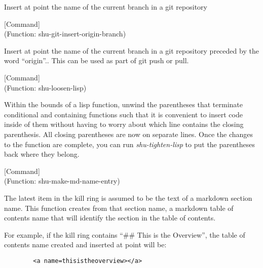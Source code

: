 \begin{doc-string}
Insert at point the name of the current branch in a git repository
\end{doc-string}

\vspace{1em}
\noindent
{}
\usebox{\funcname}
 \hfill [Command]\\%
 (Function: shu-git-insert-origin-branch)

\begin{doc-string}
Insert at point the name of the current branch in a git repository preceded by the
word ``origin''..  This can be used as part of git push or pull.
\end{doc-string}

\vspace{1em}
\noindent
{}
\usebox{\funcname}
 \hfill [Command]\\%
 (Function: shu-loosen-lisp)

\begin{doc-string}
Within the bounds of a lisp function, unwind the parentheses that terminate
conditional and containing functions such that it is convenient to insert code
inside of them without having to worry about which line contains the closing
parenthesis.  All closing parentheses are now on separate lines.  Once the
changes to the function are complete, you can run \emph{shu-tighten-lisp} to put the
parentheses back where they belong.
\end{doc-string}

\vspace{1em}
\noindent
{}
\usebox{\funcname}
 \hfill [Command]\\%
 (Function: shu-make-md-name-entry)

\begin{doc-string}
The latest item in the kill ring is assumed to be the text of a markdown
section name.  This function creates from that section name, a markdown table of
contents name that will identify the section in the table of contents.

For example, if the kill ring contains ``\#\# This is the Overview'', the table
of contents name created and inserted at point will be:

\small{\begin{verbatim}
        <a name=thisistheoverview></a>
\end{verbatim}}
\end{doc-string}

